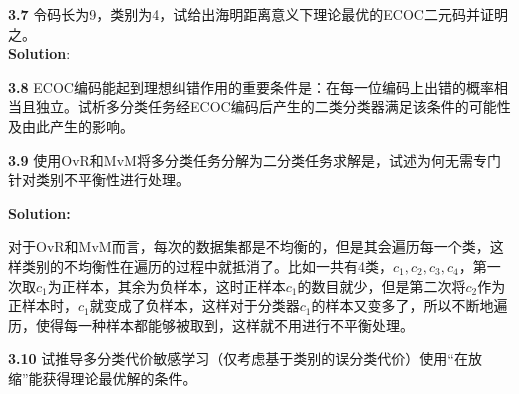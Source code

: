 \documentclass{pset}
\begin{document}
\begin{problem}%
\textbf{3.7} 令码长为9，类别为4，试给出海明距离意义下理论最优的ECOC二元码并证明之。\\

\textbf{Solution}:


\end{problem}

\begin{problem}
\textbf{3.8} ECOC编码能起到理想纠错作用的重要条件是：在每一位编码上出错的概率相当且独立。试析多分类任务经ECOC编码后产生的二类分类器满足该条件的可能性及由此产生的影响。


\end{problem}

\begin{problem}
\textbf{3.9} 使用OvR和MvM将多分类任务分解为二分类任务求解是，试述为何无需专门针对类别不平衡性进行处理。

\textbf{Solution:}

对于OvR和MvM而言，每次的数据集都是不均衡的，但是其会遍历每一个类，这样类别的不均衡性在遍历的过程中就抵消了。比如一共有4类，$c_1, c_2, c_3, c_4$，第一次取$c_1$为正样本，其余为负样本，这时正样本$c_1$的数目就少，但是第二次将$c_2$作为正样本时，$c_1$就变成了负样本，这样对于分类器$c_1$的样本又变多了，所以不断地遍历，使得每一种样本都能够被取到，这样就不用进行不平衡处理。
\end{problem}

\begin{problem}
\textbf{3.10} 试推导多分类代价敏感学习（仅考虑基于类别的误分类代价）使用“在放缩”能获得理论最优解的条件。


\end{problem}
\end{document}
